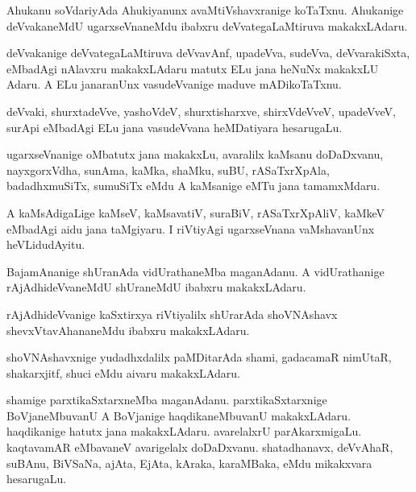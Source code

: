 \documentclass{article}
\begin{document}
\begin{mn}%
Ahukanu soVdariyAda Ahukiyanunx avaMtiVshavxranige koTaTxnu. Ahukanige
deVvakaneMdU ugarxseVnaneMdu ibabxru deVvategaLaMtiruva makakxLAdaru.
\end{mn}

\begin{mn}%
deVvakanige deVvategaLaMtiruva deVvavAnf, upadeVva, sudeVva,
deVvarakiSxta, eMbadAgi nAlavxru makakxLAdaru matutx ELu jana heNuNx
makakxLU Adaru. A ELu janaranUnx vasudeVvanige maduve mADikoTaTxnu.
\end{mn}

\begin{mn}%
deVvaki, shurxtadeVve, yashoVdeV, shurxtisharxve, shirxVdeVveV,
upadeVveV, surApi eMbadAgi ELu jana vasudeVvana heMDatiyara hesarugaLu.
\end{mn}

\begin{mn}%
ugarxseVnanige oMbatutx jana makakxLu, avaralilx kaMsanu doDaDxvanu,
nayxgorxVdha, sunAma, kaMka, shaMku, suBU, rASaTxrXpAla,
badadhxmuSiTx, sumuSiTx eMdu A kaMsanige eMTu jana tamamxMdaru.
\end{mn}

\begin{mn}%
A kaMsAdigaLige kaMseV, kaMsavatiV, suraBiV, rASaTxrXpAliV, kaMkeV
eMbadAgi aidu jana taMgiyaru. I riVtiyAgi ugarxseVnana vaMshavanUnx heVLidudAyitu.
\end{mn}

\begin{mn}
BajamAnanige shUranAda vidUrathaneMba maganAdanu. A vidUrathanige
rAjAdhideVvaneMdU shUraneMdU ibabxru makakxLAdaru.
\end{mn}

\begin{mn}
rAjAdhideVvanige kaSxtirxya riVtiyalilx shUrarAda shoVNAshavx
shevxVtavAhananeMdu ibabxru makakxLAdaru.
\end{mn}

\begin{mn}%
shoVNAshavxnige yudadhxdalilx paMDitarAda shami, gadacamaR nimUtaR,
shakarxjitf, shuci eMdu aivaru makakxLAdaru.
\end{mn}

\begin{mn}%
shamige parxtikaSxtarxneMba maganAdanu. parxtikaSxtarxnige
BoVjaneMbuvanU A BoVjanige haqdikaneMbuvanU makakxLAdaru. haqdikanige
hatutx jana makakxLAdaru. avarelalxrU parAkarxmigaLu. kaqtavamAR
eMbavaneV avarigelalx doDaDxvanu. shatadhanavx, deVvAhaR, suBAnu,
BiVSaNa, ajAta, EjAta, kAraka, karaMBaka, eMdu mikakxvara hesarugaLu.
\end{mn}
\end{document}
